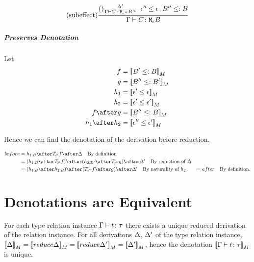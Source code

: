 {            \begin{equation}
                (\text{subeffect}) \frac{
                    (\text{}) \frac{\Delta'}{\Gamma \vdash C \colon \texttt{M}_{\epsilon''}{B''}}
                    \;\;
                    \epsilon'' \leq \epsilon
                    \;\;
                    B'' \leq: B
                }{
                    \Gamma \vdash C \colon \texttt{M}_{\epsilon}{B}
                }
            \end{equation}
            \subparagraph{Preserves Denotation}
                Let
                \begin{align}
                    f & = \deno{B' \subtype B}\\
                    g & = \deno{B'' \subtype B'}\\
                    h_1 & = \deno{\e' \subeffect \e}\\
                    h_2 & = \deno{\e' \subeffect \e'}\\
                    f\after g & = \deno{B'' \subtype B}\\
                    h_1\after h_2 & = \deno{\e'' \subeffect \e'}\\
                \end{align}

                Hence we can find the denotation of the derivation before reduction.

                \begin{align}
                    before & = h_{1, B} \after \T{\e'}{f} \after \D \qt{By definition}\\
                    & = (h_{1, B} \after \T{\e'}{f}) \after (h_{2, B'} \after \T{\e''}{g}) \after \D' \qt{By reduction of $\D$} \\
                    & = (h_{1, B}\after h_{2, B}) \after (\T{\e''}{f\after g})\after \D'\qt{By naturality of $h_2$}
                    & = after \qt{By definition.}
                \end{align}

    
    \section{Denotations are Equivalent}
    For each type relation instance $\Gamma \vdash t \colon \tau$ there exists a unique reduced derivation of the relation instance. For all derivations $\Delta$, $\Delta'$ of the type relation instance, $\deno{\D} = \deno{\reduce{\D}} = \deno{\reduce{\D'}} = \deno{\D'} $, hence the denotation ${\bf [\![}\Gamma \vdash t \colon \tau{\bf ]\!]}_M$ is unique.
    
}

\ifdefined\NoDocument
\else
\documentclass{report}


    \UniqueDenotations

\fi